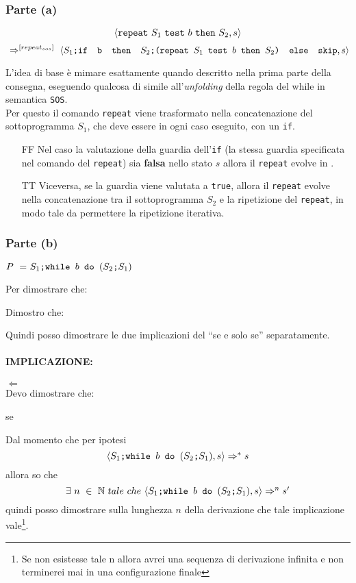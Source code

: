 {
	\subsubsection{Parte (a)}
	\begin{center}
	\[ \langle{}\texttt{repeat}~S_1~\texttt{test}~b~\texttt{then}~S_2, s\rangle{} \]
	\[~\Rightarrow^{[repeat_{sos}]}~
	\langle{}\textrm{\normalfont{\texttt{$S_1$;\mbox{\normalfont{\texttt{if }}} b \textrm{\normalfont{\texttt{ then }}} \textrm{\normalfont{\texttt{$S_2$;(\texttt{repeat}~$S_1$~\texttt{test}~$b$~\texttt{then}~$S_2$)}}} \textrm{\normalfont{\texttt{ else }}} \textrm{\normalfont{\texttt{skip}}}}}}, s\rangle{} \]

	\end{center}
	L'idea di base è mimare esattamente quando descritto nella prima parte
	della consegna, eseguendo qualcosa di simile all'\emph{unfolding} della
	regola del while in semantica \texttt{SOS}. \\
	Per questo il comando
	\texttt{repeat} viene trasformato nella concatenazione del sottoprogramma
	$S_1$, che deve essere in ogni caso eseguito, con un \texttt{if}. 
	\begin{itemize}
		\item [FF] Nel caso
		la valutazione della guardia dell'\texttt{if} (la stessa guardia
		specificata nel comando del \texttt{repeat}) sia \textbf{falsa} nello stato $s$
		allora il \texttt{repeat} evolve in \skipistr{}.
		\item [TT] Viceversa, se la guardia
		viene valutata a \texttt{true}, allora il \texttt{repeat} evolve nella
		concatenazione tra il sottoprogramma $S_2$ e la ripetizione del 
		\texttt{repeat}, in modo tale da permettere la ripetizione iterativa.\\
	\end{itemize}
	

	\subsubsection{Parte (b)}
	\begin{center}
	$P~=~\PDef{}$
	\end{center}
	Per dimostrare che:
	\begin{center}
	\exThreeB{}
	\end{center}
	Dimostro che:
	\begin{center}
	\exThreeIff{}
	\end{center}
	Quindi posso dimostrare le due implicazioni del ``se e solo se''
	separatamente.


	\paragraph{IMPLICAZIONE: } \textbf{\Large{$\Longleftarrow$}} \\
	Devo dimostrare che:
	\begin{center}
	se \exThreeRtL{}
	\end{center}
	Dal momento che per ipotesi \[ \confSs{\PDef{}}{s}\Rar{*}s \] allora so che 
	\[ \exists{}~n~\in~\mathbb{N}~tale~che~\confSs{\PDef{}}{s}\Rar{n}s'  \]quindi
	posso dimostrare sulla lunghezza $n$ della derivazione che tale
	implicazione vale\footnote{Se non esistesse tale n allora avrei una sequenza di derivazione infinita e non terminerei mai in una configurazione finale}.\\
}
